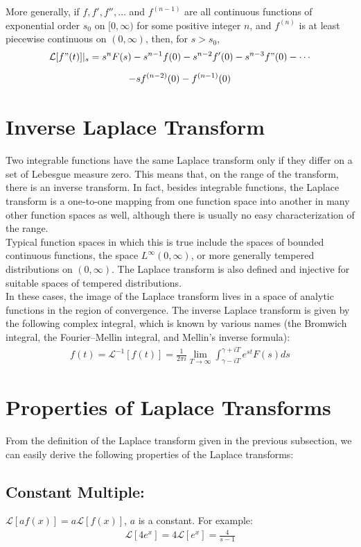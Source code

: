 \documentclass[11pt]{report}
\newcommand{\sps}{\\[0.2cm]}
\newcommand{\NI}{\noindent}
\begin{document}
	\NI More generally, if $f, f', f'',\ldots$ and  $f^{(n-1)}$ are all continuous functions of exponential order $s_0$ on $[0, \infty)$ for some positive integer $n$, and $f^{(n)}$ is at least piecewise continuous on $(0, \infty)$, then, for $s>s_0$,
	\begin{multline*}
		\mathcal{L}[f"(t)]|_s = s^n F(s) - s^{n-1} f(0) - s^{n-2}f'(0) - s^{n-3}f"(0) - \cdots \sps- sf^{(n-2)}(0) - f^{(n-1)}(0)
	\end{multline*}

	\section{Inverse Laplace Transform}
	Two integrable functions have the same Laplace transform only if they differ on a set of Lebesgue measure zero. This means that, on the range of the transform, there is an inverse transform. In fact, besides integrable functions, the Laplace transform is a one-to-one mapping from one function space into another in many other function spaces as well, although there is usually no easy characterization of the range.\\

	\NI Typical function spaces in which this is true include the spaces of bounded continuous functions, the space $L^\infty (0 , \infty)$, or more generally tempered distributions on $(0 , \infty)$. The Laplace transform is also defined and injective for suitable spaces of tempered distributions.\\
	
	\NI In these cases, the image of the Laplace transform lives in a space of analytic functions in the region of convergence. The inverse Laplace transform is given by the following complex integral, which is known by various names (the Bromwich integral, the Fourier–Mellin integral, and Mellin's inverse formula):
	\begin{eqnarray*}
		f(t) = \mathcal{L}^{-1} [f(t)] = \frac{1}{2\pi i} \lim_{T \to \infty}\int_{\gamma - iT}^{\gamma + iT} e^{st} F(s) ds
	\end{eqnarray*}

	\section{Properties of Laplace Transforms}
	From the definition of the Laplace transform given in the previous subsection, we can easily derive the following properties of the Laplace transforms:
	
	\subsection{Constant Multiple:} 
	$\mathcal{L}[af(x)] = a \mathcal{L}[f(x)]$, $a$ is a constant. For example:
	\begin{eqnarray*}
		\mathcal{L}[4e^x] = 4 \mathcal{L}[e^x] = \frac{4}{s - 1}
	\end{eqnarray*}
	
\end{document}
